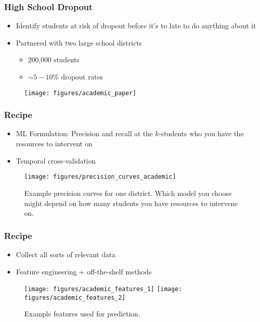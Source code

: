 \documentclass[10pt,mathserif]{beamer}
\begin{document}
\begin{frame}
  \frametitle{High School Dropout}
  \begin{itemize}
  \item Identify students at risk of dropout before it's to late to do anything
    about it
  \item Partnered with two large school districts
    \begin{itemize}
    \item 200,000 students
    \item $\sim 5 - 10\%$ dropout rates
    \end{itemize}
  \end{itemize}
  \begin{figure}
    \centering
    \texttt{[image: figures/academic\_paper]}
  \end{figure}
\end{frame}

\begin{frame}
  \frametitle{Recipe}
  \begin{itemize}
  \item ML Formulation: Precision and recall at the $k$-students who you have
    the resources to intervent on
  \item Temporal cross-validation
  \end{itemize}
  \begin{figure}[ht]
    \centering
    \texttt{[image: figures/precision\_curves\_academic]}
    \caption{Example precision curves for one district. Which model you choose
      might depend on how many students you have resources to intervene
      on.\label{fig:label} }
  \end{figure}
\end{frame}

\begin{frame}
  \frametitle{Recipe}
  \begin{itemize}
  \item Collect all sorts of relevant data
  \item Feature engineering + off-the-shelf methods
  \end{itemize}
  \begin{figure}
    \texttt{[image: figures/academic\_features\_1]}
    \texttt{[image: figures/academic\_features\_2]}
    \caption{Example features used for prediction.}
\end{figure}

\end{frame}
\end{document}
